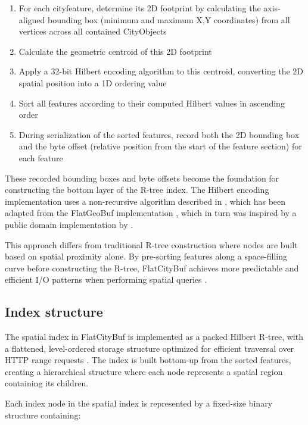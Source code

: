 \begin{enumerate}
  \item For each \ac{cityfeature}, determine its 2D footprint by calculating the axis-aligned bounding box (minimum and maximum X,Y coordinates) from all vertices across all contained CityObjects
  \item Calculate the geometric centroid of this 2D footprint
  \item Apply a 32-bit Hilbert encoding algorithm to this centroid, converting the 2D spatial position into a 1D ordering value
  \item Sort all features according to their computed Hilbert values in ascending order
  \item During serialization of the sorted features, record both the 2D bounding box and the byte offset (relative position from the start of the feature section) for each feature
\end{enumerate}

These recorded bounding boxes and byte offsets become the foundation for constructing the bottom layer of the R-tree index. The Hilbert encoding implementation uses a non-recursive algorithm described in \citet{hacker_delight_2012}, which has been adapted from the FlatGeoBuf implementation \citep{flatgeobuf_github}, which in turn was inspired by a public domain implementation by \citet{rawrunprotected_2016}.

This approach differs from traditional R-tree construction where nodes are built based on spatial proximity alone. By pre-sorting features along a space-filling curve before constructing the R-tree, FlatCityBuf achieves more predictable and efficient I/O patterns when performing spatial queries \citep{horance_2022_overview}.

\subsection{Index structure}
\label{methodology:spatial_index:index_structure}

The spatial index in FlatCityBuf is implemented as a packed Hilbert R-tree, with a flattened, level-ordered storage structure optimized for efficient traversal over HTTP range requests \citep{horance_2022_detail}. The index is built bottom-up from the sorted features, creating a hierarchical structure where each node represents a spatial region containing its children.

Each index node in the spatial index is represented by a fixed-size binary structure containing:

